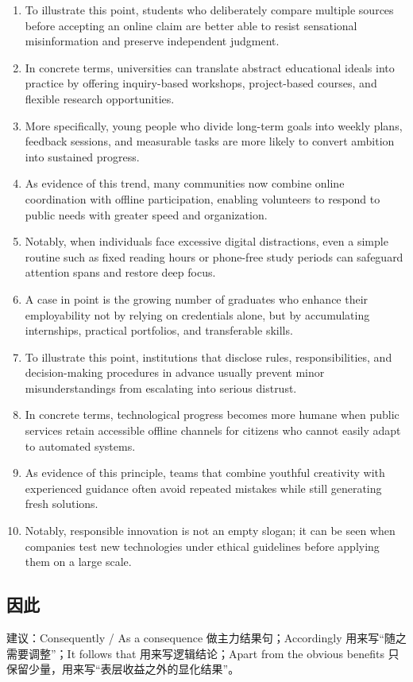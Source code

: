 \begin{enumerate}
    \item To illustrate this point, students who deliberately compare multiple sources before accepting an online claim are better able to resist sensational misinformation and preserve independent judgment. 
    \item In concrete terms, universities can translate abstract educational ideals into practice by offering inquiry-based workshops, project-based courses, and flexible research opportunities. 
    \item More specifically, young people who divide long-term goals into weekly plans, feedback sessions, and measurable tasks are more likely to convert ambition into sustained progress. 
    \item As evidence of this trend, many communities now combine online coordination with offline participation, enabling volunteers to respond to public needs with greater speed and organization. 
    \item Notably, when individuals face excessive digital distractions, even a simple routine such as fixed reading hours or phone-free study periods can safeguard attention spans and restore deep focus. 
    \item A case in point is the growing number of graduates who enhance their employability not by relying on credentials alone, but by accumulating internships, practical portfolios, and transferable skills. 
    \item To illustrate this point, institutions that disclose rules, responsibilities, and decision-making procedures in advance usually prevent minor misunderstandings from escalating into serious distrust. 
    \item In concrete terms, technological progress becomes more humane when public services retain accessible offline channels for citizens who cannot easily adapt to automated systems. 
    \item As evidence of this principle, teams that combine youthful creativity with experienced guidance often avoid repeated mistakes while still generating fresh solutions. 
    \item Notably, responsible innovation is not an empty slogan; it can be seen when companies test new technologies under ethical guidelines before applying them on a large scale.
\end{enumerate}

\subsection{因此}
建议：Consequently / As a consequence 做主力结果句；Accordingly 用来写“随之需要调整”；It follows that 用来写逻辑结论；Apart from the obvious benefits 只保留少量，用来写“表层收益之外的显化结果”。

